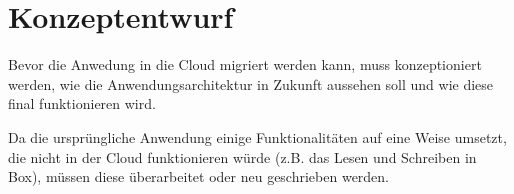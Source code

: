 \section{Konzeptentwurf}
Bevor die Anwedung in die Cloud migriert werden kann, muss konzeptioniert werden, wie die
Anwendungsarchitektur in Zukunft aussehen soll und wie diese final funktionieren wird.

Da die ursprüngliche Anwendung einige Funktionalitäten auf eine Weise umsetzt, die nicht in der
Cloud funktionieren würde (z.B. das Lesen und Schreiben in Box), müssen diese überarbeitet oder
neu geschrieben werden.